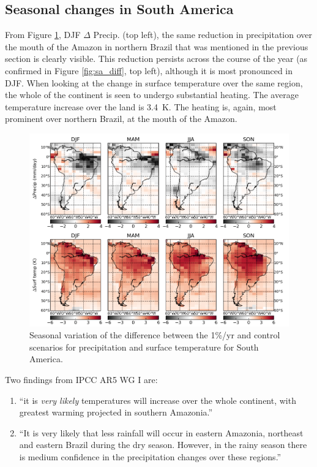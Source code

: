 \documentclass{article}
\begin{document}
\newpage
\subsection{Seasonal changes in South America}
\label{subsec:seasonal_changes}

From Figure \ref{fig:sa_seasonal}, DJF $\Delta$ Precip. (top left), the same reduction in precipitation over the mouth of the Amazon in northern Brazil that was mentioned in the previous section is clearly visible. This reduction persists across the course of the year (as confirmed in Figure \ref{fig:sa_diff}, top left), although it is most pronounced in DJF. When looking at the change in surface temperature over the same region, the whole of the continent is seen to undergo substantial heating. The average temperature increase over the land is \SI{3.4}{K}. The heating is, again, most prominent over northern Brazil, at the mouth of the Amazon.

\begin{figure}[hbp]
    \centering
    \includegraphics[width=\textwidth]{figures/sa_seasonal}
    \caption{Seasonal variation of the difference between the 1\%/yr and control scenarios for precipitation and surface temperature for South America.}
    \label{fig:sa_seasonal}
\end{figure}

Two findings from IPCC AR5 WG I \parencite{ipcc2014wg1} are:
\begin{enumerate}
    \item ``it is \textit{very likely} temperatures will increase over the whole continent, with greatest warming projected in southern Amazonia.''
    \item ``It is very likely that less rainfall will occur in eastern Amazonia, northeast and eastern Brazil during the dry season. However, in the rainy season there is medium confidence in the precipitation changes over these regions.''
\end{enumerate}
\end{document}
